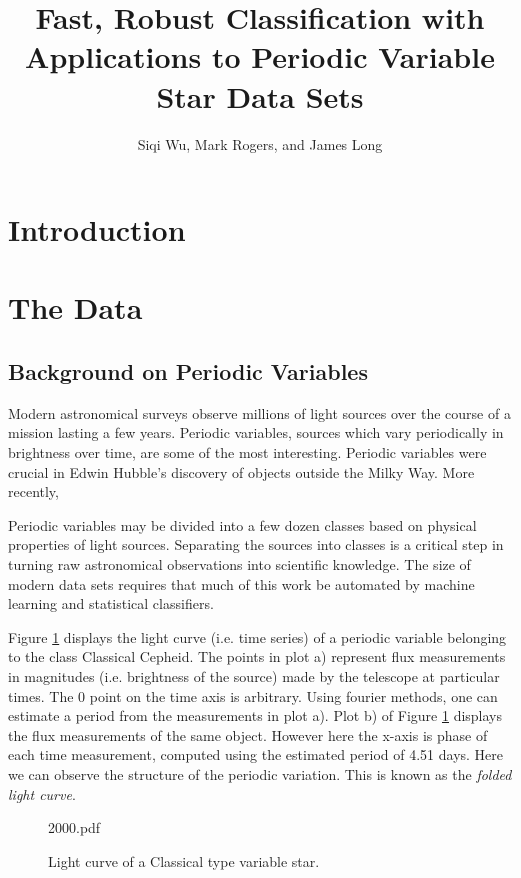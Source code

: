 \documentclass[11pt]{article}
\begin{document}
\title{Fast, Robust Classification with Applications to Periodic Variable Star Data Sets}
\author{Siqi Wu, Mark Rogers, and James Long}
\maketitle


\section{Introduction}

\section{The Data}
\subsection{Background on Periodic Variables}
Modern astronomical surveys observe millions of light sources over the course of a mission lasting a few years. Periodic variables, sources which vary periodically in brightness over time, are some of the most interesting. Periodic variables were crucial in Edwin Hubble's discovery of objects outside the Milky Way. More recently, 

Periodic variables may be divided into a few dozen classes based on physical properties of light sources. Separating the sources into classes is a critical step in turning raw astronomical observations into scientific knowledge. The size of modern data sets requires that much of this work be automated by machine learning and statistical classifiers. 

Figure \ref{fig:cepheid} displays the light curve (i.e. time series) of a periodic variable belonging to the class Classical Cepheid. The points in plot a) represent flux measurements in magnitudes (i.e. brightness of the source) made by the telescope at particular times. The 0 point on the time axis is arbitrary. Using fourier methods, one can estimate a period from the measurements in plot a).  Plot b) of Figure \ref{fig:cepheid} displays the flux measurements of the same object. However here the x-axis is phase of each time measurement, computed using the estimated period of 4.51 days. Here we can observe the structure of the periodic variation. This is known as the \textit{folded light curve}.
\begin{figure}[h]
  \begin{center}
    \begin{includegraphics}[scale=.5]{2000.pdf}
      \caption{Light curve of a Classical type variable star.\label{fig:cepheid}}
    \end{includegraphics}
  \end{center}
\end{figure}
\end{document}
